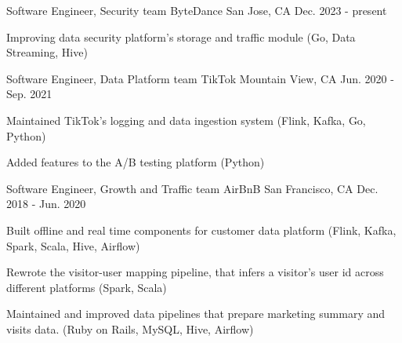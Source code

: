 

\begin{cventries}

  \cventry
    {Software Engineer, Security team} %
    {ByteDance} %
    {San Jose, CA} %
    {Dec. 2023 - present} %
    {
      \begin{cvitems} %
        \item {Improving data security platform's storage and traffic module (Go, Data Streaming, Hive)}
      \end{cvitems}
    }


  \cventry
    {Software Engineer, Data Platform team} %
    {TikTok} %
    {Mountain View, CA} %
    {Jun. 2020 - Sep. 2021} %
    {
      \begin{cvitems} %
        \item {Maintained TikTok's logging and data ingestion system (Flink, Kafka, Go, Python)}
        \item {Added features to the A/B testing platform (Python)}
      \end{cvitems}
    }

  \cventry
    {Software Engineer, Growth and Traffic team} %
    {AirBnB} %
    {San Francisco, CA} %
    {Dec. 2018 - Jun. 2020} %
    {
      \begin{cvitems} %
        \item {Built offline and real time components for customer data platform (Flink, Kafka, Spark, Scala, Hive, Airflow)}
        \item {Rewrote the visitor-user mapping pipeline, that infers a visitor's user id across different platforms (Spark, Scala)}
        \item {Maintained and improved data pipelines that prepare marketing summary and visits data. (Ruby on Rails, MySQL, Hive, Airflow)}
      \end{cvitems}
    }


\end{cventries}
